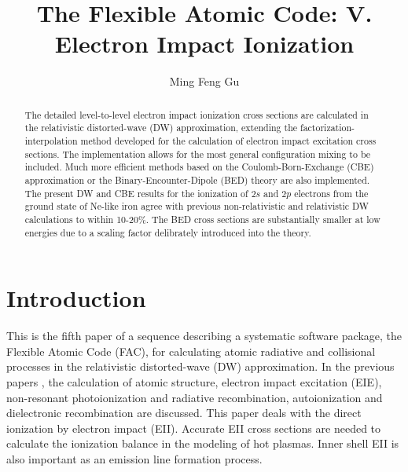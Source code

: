 \documentclass[preprint, floatfix, pra, showpacs, showkeys]{revtex4}
\begin{document}
\title{The Flexible Atomic Code: V. Electron Impact Ionization}  
\author{Ming Feng Gu}

\begin{abstract} 
The detailed level-to-level electron impact ionization cross sections are
calculated in the relativistic distorted-wave (DW) approximation, extending
the factorization-interpolation method developed for the calculation of
electron impact excitation cross sections. The implementation allows for the
most general configuration mixing to be included. Much more efficient methods
based on the Coulomb-Born-Exchange (CBE) approximation or the
Binary-Encounter-Dipole (BED) theory 
are also implemented. The present DW and CBE results for the ionization of
$2s$ and $2p$ electrons from the ground state of Ne-like iron agree with
previous non-relativistic and relativistic DW calculations to within
10-20\%. The BED cross sections are substantially smaller at low energies due
to a scaling factor delibrately introduced into the theory.
\end{abstract}

\maketitle

\section{Introduction}
This is the fifth paper of a sequence describing a systematic software
package, the Flexible Atomic Code (FAC), 
for calculating atomic radiative and collisional processes in the relativistic
distorted-wave (DW) approximation. In the previous papers
\cite{gu02a,gu02b,gu02c,gu02d}, the
calculation of atomic structure, electron impact excitation (EIE),
non-resonant photoionization and radiative recombination, autoionization and
dielectronic recombination are discussed. This paper deals with the direct
ionization by electron impact (EII). Accurate EII cross sections are needed
to calculate the ionization balance in the modeling of hot plasmas. Inner
shell EII is also important as an emission line formation process. 
\end{document}
